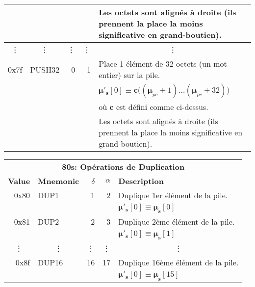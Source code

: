 \documentclass[9pt,oneside]{amsart}
\begin{document}
\begin{tabular*}{\columnwidth}[h]{rlrrl}
&&&& Les octets sont alignés à droite (ils prennent la place la moins significative en grand-boutien). \\
\midrule
\multicolumn{1}{c}{\vdots} & \multicolumn{1}{c}{\vdots} & \vdots & \vdots & \multicolumn{1}{c}{\vdots} \\
\midrule
0x7f & {\small PUSH32} & 0 & 1 & Place 1 élément de 32 octets (un mot entier) sur la pile. \\
&&&& $\boldsymbol{\mu}'_\mathbf{s}[0] \equiv \boldsymbol{c}\big((\boldsymbol{\mu}_{pc} + 1) \dots (\boldsymbol{\mu}_{pc} + 32) \big)$ \\
&&&& où $\boldsymbol{c}$ est défini comme ci-dessus. \\
&&&& Les octets sont alignés à droite (ils prennent la place la moins significative en grand-boutien). \\
\bottomrule
\end{tabular*}

\begin{tabular*}{\columnwidth}[h]{rlrrl}
\toprule
\multicolumn{5}{c}{\textbf{80s: Opérations de Duplication }} \vspace{5pt} \\
\textbf{Value} & \textbf{Mnemonic} & $\delta$ & $\alpha$ & \textbf{Description} \vspace{5pt} \\
0x80 & {\small DUP1} & 1 & 2 & Duplique 1er élément de la pile. \\
&&&& $\boldsymbol{\mu}'_\mathbf{s}[0] \equiv \boldsymbol{\mu}_\mathbf{s}[0]$ \\
\midrule
0x81 & {\small DUP2} & 2 & 3 & Duplique 2ème élément de la pile. \\
&&&& $\boldsymbol{\mu}'_\mathbf{s}[0] \equiv \boldsymbol{\mu}_\mathbf{s}[1]$ \\
\midrule
\multicolumn{1}{c}{\vdots} & \multicolumn{1}{c}{\vdots} & \vdots & \vdots & \multicolumn{1}{c}{\vdots} \\
\midrule
0x8f & {\small DUP16} & 16 & 17 & Duplique 16ème élément de la pile. \\
&&&& $\boldsymbol{\mu}'_\mathbf{s}[0] \equiv \boldsymbol{\mu}_\mathbf{s}[15]$ \\
\bottomrule
\end{tabular*}
\end{document}

